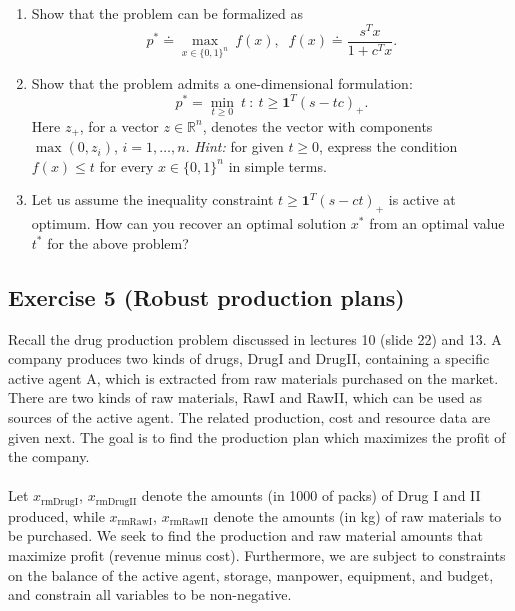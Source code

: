 \documentclass[11pt]{article}
\begin{document}
\begin{enumerate}
    \item Show that the problem can be formalized as
    \[
    p^* \doteq \max_{x \in \{0,1\}^n} \: f(x), \;\; f(x) \doteq \frac{s^T x}{1+c^T x} .
    \]

    \item Show that the problem admits a one-dimensional formulation:
    \[
    p^* = \min_{t \ge 0} \: t ~:~ t  \ge \mathbf{1}^T (s-tc)_+.
    \]
    Here $z_+$, for a vector $z \in \mathbb{R}^{n}$, denotes the vector with components $\max(0,z_i)$, $i=1,\ldots,n$. {\em Hint:} for given $t \ge 0$, express the condition $f(x) \le t$ for every $x \in \{0,1\}^n$ in simple terms.

    \item Let us assume the inequality constraint $t \ge \mathbf{1}^T (s-ct)_+$ is active at optimum. How can you recover an optimal solution $x^*$ from an optimal value $t^*$ for the above problem?
\end{enumerate}

\begin{solution}
\end{solution}

\newpage
\subsection*{Exercise 5 (Robust production plans)}

Recall the drug production problem discussed in lectures 10 (slide 22) and 13. A company produces two kinds of drugs, DrugI and DrugII, containing a specific active agent A, which is extracted from raw materials purchased on the market. There are two kinds of raw materials, RawI and RawII, which can be used as sources of the active agent.  The related production, cost and resource data are given next.  The goal is to find the production plan which maximizes the profit of the company. \\ \\
Let $x_{\text{rmDrugI}}$, $x_{\text{rmDrugII}}$ denote the amounts (in 1000 of packs) of Drug I and II produced, while $x_{\text{rmRawI}}$, $x_{\text{rmRawII}}$ denote the amounts (in kg) of raw materials to be purchased. We seek to find the production and raw material amounts that maximize profit (revenue minus cost). Furthermore, we are subject to constraints on the balance of the active agent, storage, manpower, equipment, and budget, and constrain all variables to be non-negative. \\ \\
\end{document}
